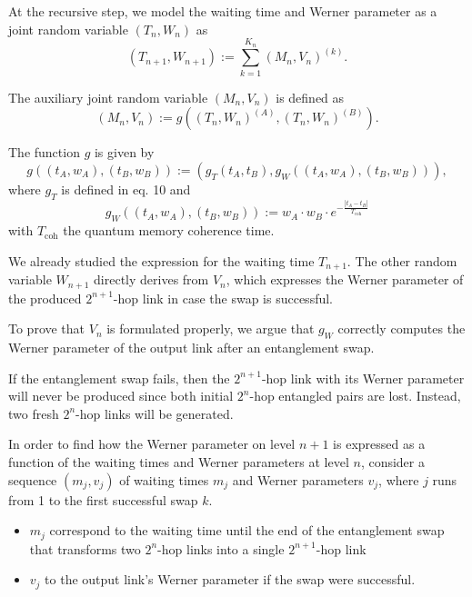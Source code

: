 \documentclass{masterthesis}
\begin{document}
At the recursive step, we model the waiting time and Werner parameter as a joint random variable $(T_n, W_n)$ as
\begin{equation}
    (T_{n+1}, W_{n+1}) := \sum_{k=1}^{K_n} (M_n, V_n)^{(k)}. %
\end{equation}

The auxiliary joint random variable $(M_n, V_n)$ is defined as
\begin{equation}
    (M_n, V_n) := g\left((T_n, W_n)^{(A)}, (T_n, W_n)^{(B)}\right).
\end{equation}

The function $g$ is given by
\begin{equation}
    g\left((t_A, w_A),(t_B, w_B)\right) := \left(g_T(t_A, t_B), g_W\left((t_A, w_A),(t_B, w_B)\right)\right),
\end{equation}
where $g_T$ is defined in eq. 10 and %
\begin{equation}
    g_W\left((t_A, w_A),(t_B, w_B)\right) := w_A \cdot w_B \cdot e^{-\frac{|t_A-t_B|}{T_{\text{coh}}}}
\end{equation}
with $T_{\text{coh}}$ the quantum memory coherence time.

We already studied the expression for the waiting time $T_{n+1}$. The other random variable $W_{n+1}$ directly derives from $V_{n}$, which expresses the Werner parameter of the produced $2^{n+1}$-hop link in case the swap is successful.

To prove that $V_{n}$ is formulated properly, we argue that $g_{W}$ correctly computes the Werner parameter of the output link after an entanglement swap.

If the entanglement swap fails, then the $2^{n+1}$-hop link with its Werner parameter will never be produced since both initial $2^{n}$-hop entangled pairs are lost. Instead, two fresh $2^{n}$-hop links will be generated. 

In order to find how the Werner parameter on level $n+1$ is expressed as a function of the waiting times and Werner parameters at level $n$, consider a sequence $\left(m_{j}, v_{j}\right)$ of waiting times $m_{j}$ and Werner parameters $v_{j}$, where $j$ runs from 1 to the first successful swap $k$. 
\begin{itemize}
    \item $m_{j}$ correspond to the waiting time until the end of the entanglement swap that transforms two $2^{n}$-hop links into a single $2^{n+1}$-hop link
    \item $v_{j}$ to the output link's Werner parameter if the swap were successful. 
\end{itemize}
\end{document}
